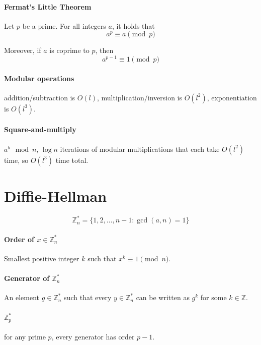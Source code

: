 \documentclass[11pt]{article}
\begin{document}
\paragraph{Fermat's Little Theorem}

\begin{theorem}
Let $p$ be a prime. For all integers $a$, it holds that
\[ a^p \equiv a \pmod{p} \]

Moreover, if $a$ is coprime to $p$, then
\[ a^{p-1} \equiv 1 \pmod{p} \]
\end{theorem}

\paragraph{Modular operations} addition/subtraction is $O(l)$, multiplication/inversion is $O(l^2)$, exponentiation is $O(l^3)$.

\paragraph{Square-and-multiply} $a^b \mod n$, $\log n$ iterations of modular multiplications that each take $O(l^2)$ time, so $O(l^3)$ time total.

\section{Diffie-Hellman}

$$\mathbb{Z}_n^* = \{1, 2, \ldots, n-1 : \gcd(a, n) = 1\}$$

\paragraph{Order of $x \in \mathbb{Z}_n^*$} Smallest positive integer $k$ such that $x^k \equiv 1 \pmod{n}$.

\paragraph{Generator of $\mathbb{Z}_n^*$} An element $g \in \mathbb{Z}_n^*$ such that every $y \in \mathbb{Z}_n^*$ can be written as $g^k$ for some $k \in \mathbb{Z}$.

\paragraph{$\mathbb{Z}_p^*$} for any prime $p$, every generator has order $p-1$.
\end{document}

